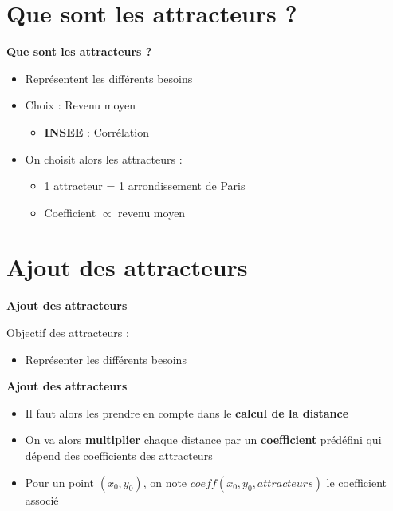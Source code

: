 \documentclass[10pt]{beamer}
\begin{document}
\section{Que sont les attracteurs ?}
\begin{frame}{\textbf{Que sont les attracteurs ?}}

    \begin{itemize}
        \item Représentent les différents besoins
        \item Choix : Revenu moyen
        \begin{itemize}
            \item \textbf{INSEE} : Corrélation
        \end{itemize}
        \item On choisit alors les attracteurs :
        \begin{itemize}
            \item 1 attracteur = 1 arrondissement de Paris
            \item Coefficient $\propto$ revenu moyen
        \end{itemize}
    \end{itemize}

\end{frame}


\section{Ajout des attracteurs}
\begin{frame}{\textbf{Ajout des attracteurs}}

    Objectif des attracteurs :
    \begin{itemize}
        \item Représenter les différents besoins
    \end{itemize}
    
    \lstset{style=styleC}
    

\end{frame}


\begin{frame}{\textbf{Ajout des attracteurs}}

    \begin{itemize}
        \item Il faut alors les prendre en compte dans le \textbf{calcul de la distance}
        \item On va alors \textbf{multiplier} chaque distance par un \textbf{coefficient} prédéfini qui dépend des coefficients des attracteurs
        \item Pour un point $(x_0, y_0)$, on note $coeff(x_0, y_0, attracteurs)$ le coefficient associé
    \end{itemize}

\end{frame}
\end{document}
